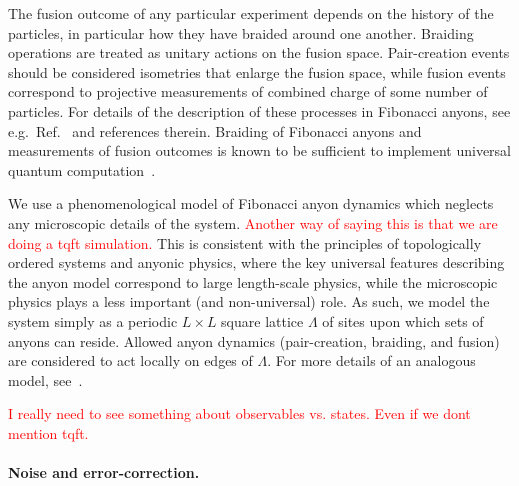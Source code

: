 \documentclass[aps, prl, letterpaper, twocolumn, superscriptaddress, notitlepage, 10pt]{revtex4-1}
\newcommand{\dude}[1]{\textcolor{red}{#1}}
\begin{document}
The fusion outcome of any particular experiment depends on the history of the particles, in 
particular how they have braided around one another. Braiding operations are treated as 
unitary actions on the fusion space. Pair-creation events should be considered isometries 
that enlarge the fusion space, while fusion events correspond to projective measurements 
of combined charge of some number of particles. For details of the description of these 
processes in Fibonacci anyons, see e.g.~Ref.~\cite{Nayak2008} and references therein. 
Braiding of Fibonacci anyons and measurements of fusion outcomes is known to be 
sufficient to implement universal quantum computation~\cite{Freedman2002, Nayak2008}.

We use a phenomenological model of Fibonacci anyon dynamics which neglects any 
microscopic details of the system. 
\dude{Another way of saying this is that we are doing a tqft simulation.}
This is consistent with the principles of topologically 
ordered systems and anyonic physics, where the key universal features describing the 
anyon model correspond to large length-scale physics, while the microscopic physics plays 
a less important (and non-universal) role. As such, we model the system simply as a 
periodic $L\times L$ square lattice $\Lambda$ of sites upon which sets of anyons can 
reside. Allowed anyon dynamics (pair-creation, braiding, and fusion) are considered to act 
locally on edges of $\Lambda$. For more details of an analogous model, see~\cite{Brell2013}.

\dude{I really need to see something about observables vs. states. Even if
we dont mention tqft.}

\paragraph{Noise and error-correction.}
\end{document}
